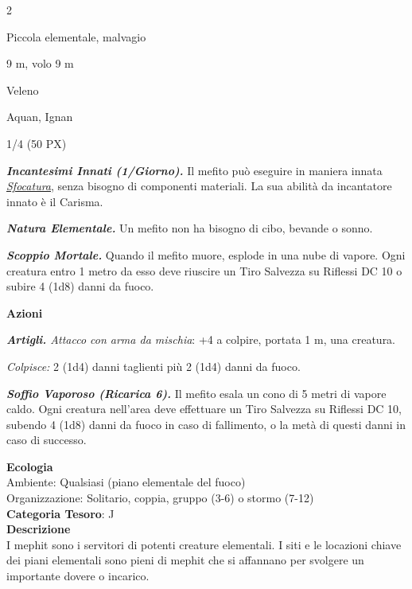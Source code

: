 \begin{multicols}{2}
{
\begin{description}[noitemsep, topsep=0pt, parsep=0pt, partopsep=0pt, itemsep=1pt, leftmargin=2.35cm,  labelwidth=2.2cm, itemindent=0cm, listparindent=0pt] %
\setlength{\baselineskip}{10pt}
\item[\textbf{Taglia/Tipo}] Piccola elementale, malvagio
\item[\textbf{Caratt.}] 
\item[\textbf{Punti Ferita}] 
\item[\textbf{Movimento}] 9 m, volo 9 m
\item[\textbf{Tiri Salvez.}] 
\item[\textbf{Imm. Danni}] Veleno
\item[\textbf{Sensi}] 
\item[\textbf{Linguaggi}] Aquan, Ignan
\item[\textbf{Sfida}] 1/4 (50 PX)
\end{description}
\smallskip

\emph{\textbf{Incantesimi Innati (1/Giorno).}} Il mefito può eseguire in maniera innata \emph{\hyperlink{Sfocatura}{Sfocatura}}, senza bisogno di componenti materiali. La sua abilità da incantatore innato è il Carisma.

\emph{\textbf{Natura Elementale.}} Un mefito non ha bisogno di cibo, bevande o sonno.

\emph{\textbf{Scoppio Mortale.}} Quando il mefito muore, esplode in una nube di vapore. Ogni creatura entro 1 metro da esso deve riuscire un Tiro Salvezza su Riflessi DC 10 o subire 4 (1d8) danni da fuoco.

\textbf{Azioni}

\emph{\textbf{Artigli.} Attacco con arma da mischia}: +4 a colpire, portata 1 m, una creatura.

\emph{Colpisce:} 2 (1d4) danni taglienti più 2 (1d4) danni da fuoco.

\emph{\textbf{Soffio Vaporoso (Ricarica 6).}} Il mefito esala un cono di 5 metri di vapore caldo. Ogni creatura nell'area deve effettuare un Tiro Salvezza su Riflessi DC 10, subendo 4 (1d8) danni da fuoco in caso di fallimento, o la metà di questi danni in caso di successo.

\textbf{Ecologia}\\
Ambiente: Qualsiasi (piano elementale del fuoco)\\
Organizzazione: Solitario, coppia, gruppo (3-6) o stormo (7-12)\\
\textbf{Categoria Tesoro}: J\\
\textbf{Descrizione}\\
I mephit sono i servitori di potenti creature elementali. I siti e le locazioni chiave dei piani elementali sono pieni di mephit che si affannano per svolgere un importante dovere o incarico.

}
\end{multicols}

